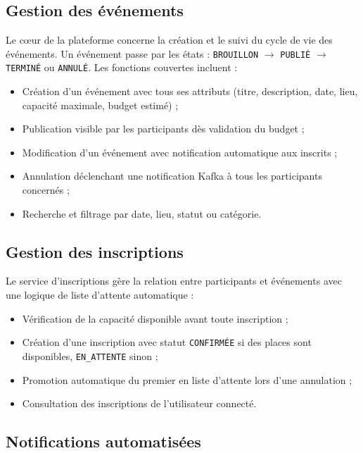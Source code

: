 \documentclass[12pt,a4paper]{report}
\begin{document}
\subsection{Gestion des \'ev\'enements}

Le c\oe ur de la plateforme concerne la cr\'eation et le suivi du cycle de vie des \'ev\'enements.
Un \'ev\'enement passe par les \'etats : \texttt{BROUILLON} $\rightarrow$ \texttt{PUBLI\'E}
$\rightarrow$ \texttt{TERMIN\'E} ou \texttt{ANNUL\'E}. Les fonctions couvertes incluent :
\begin{itemize}[noitemsep]
  \item Cr\'eation d'un \'ev\'enement avec tous ses attributs (titre, description, date,
  lieu, capacit\'e maximale, budget estim\'e) ;
  \item Publication visible par les participants d\`es validation du budget ;
  \item Modification d'un \'ev\'enement avec notification automatique aux inscrits ;
  \item Annulation d\'eclenchant une notification Kafka \`a tous les participants concern\'es ;
  \item Recherche et filtrage par date, lieu, statut ou cat\'egorie.
\end{itemize}

\subsection{Gestion des inscriptions}

Le service d'inscriptions g\`ere la relation entre participants et \'ev\'enements avec une
logique de liste d'attente automatique :
\begin{itemize}[noitemsep]
  \item V\'erification de la capacit\'e disponible avant toute inscription ;
  \item Cr\'eation d'une inscription avec statut \texttt{CONFIRM\'EE} si des places sont disponibles,
  \texttt{EN\_ATTENTE} sinon ;
  \item Promotion automatique du premier en liste d'attente lors d'une annulation ;
  \item Consultation des inscriptions de l'utilisateur connect\'e.
\end{itemize}

\subsection{Notifications automatis\'ees}
\end{document}
